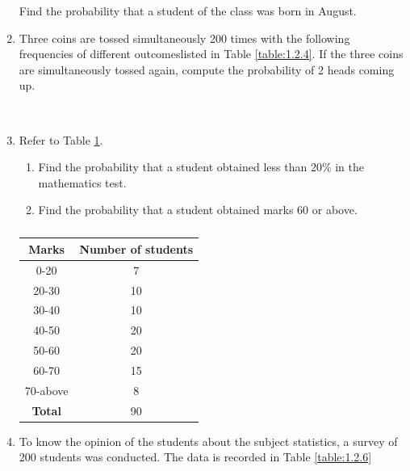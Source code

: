 \begin{enumerate}[label=\arabic*.,ref=\thesubsection.\theenumi]
    Find the probability that a student of the class was born in August.

\item Three coins are tossed simultaneously 200 times with the following frequencies of different outcomeslisted in Table \ref{table:1.2.4}.
If the three coins are simultaneously tossed again, compute the probability of 2 heads coming up.
%
\begin{table}[!ht]
\caption{}
\label{table:1.2.4}
\end{table}
\\
\solution

\item Refer to Table \ref{table:1.2.5}.
\begin{enumerate}
\item  Find the probability that a student obtained less than 20$\%$ in the mathematics test.
\item  Find the probability that a student obtained marks 60 or above.
\end{enumerate}
\begin{table}[!ht]
\centering
\begin{tabular}{ |c|c| } 
 \hline
 \textbf{Marks} &\textbf{Number of students}\\
 \hline
  0-20 &7\\ 
  20-30 &10\\ 
  30-40 &10\\ 
  40-50 &20\\ 
  50-60 &20\\ 
  60-70 &15\\ 
  70-above &8\\ 
  \hline
 \textbf{Total}  &90\\ 
 \hline
\end{tabular}
\caption{}
\label{table:1.2.5}
\end{table}
\solution

%
\item To know the opinion of the students about the subject statistics, a survey of 200 students was conducted. The data is recorded in Table \ref{table:1.2.6}

\end{enumerate}
